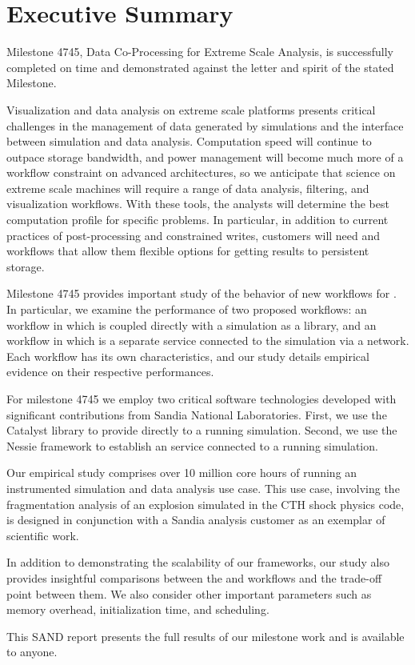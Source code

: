 \section*{Executive Summary}

Milestone 4745, Data Co-Processing for Extreme Scale Analysis, is
successfully completed on time and demonstrated against the letter and
spirit of the stated Milestone.

Visualization and data analysis on extreme scale platforms presents
critical challenges in the management of data generated by simulations and
the interface between simulation and data analysis.  Computation speed will
continue to outpace storage bandwidth, and power management will become
much more of a workflow constraint on advanced architectures, so we
anticipate that science on extreme scale machines will require a range of
data analysis, filtering, and visualization workflows.  With these tools, the
analysts will determine 
the best computation profile for specific problems.  In particular, in 
addition to current
practices of post-processing and constrained writes, customers will need
\insitu and \intransit workflows that allow them flexible options for
getting results to persistent storage.

Milestone 4745 provides important study of the behavior of new workflows
for \vda.  In particular, we examine the performance of two proposed
workflows: an \insitu workflow in which \vda is coupled directly with a
simulation as a library, and an \intransit workflow in which \vda is a separate
service connected to the simulation via a network.  Each workflow has its
own characteristics, and our study details empirical evidence on their
respective performances.

For milestone 4745 we employ two critical software technologies developed
with significant contributions from Sandia National Laboratories.  First,
we use the Catalyst library to provide \insitu \vda directly to a running
simulation.  Second, we use the Nessie framework to establish an \intransit
\vda service connected to a running simulation.

Our empirical study comprises over 10 million core hours of running an
instrumented simulation and data analysis use case.  This use case, involving
the fragmentation analysis of an explosion simulated in the CTH shock
physics code, is designed in conjunction with a Sandia analysis customer as
an exemplar of scientific work.

In addition to demonstrating the scalability of our frameworks, our study
also provides insightful comparisons between the \insitu and \intransit
workflows and the trade-off point between them.  We also consider other
important parameters such as memory overhead, initialization time, and
scheduling.

This SAND report presents the full results of our milestone work and is
available to anyone.
